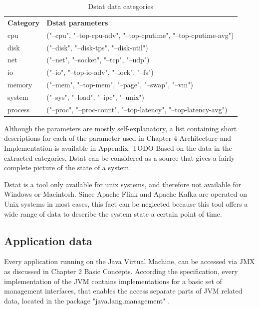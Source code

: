 \begin{table}[H]
    \begin{tabular}{ll}
        \textbf{Category} & \textbf{Dstat parameters} \\
        cpu & ("--cpu", "--top-cpu-adv", "--top-cputime", "--top-cputime-avg")\\
        disk & ("--disk", "--disk-tps", "--disk-util")\\
        net & ("--net", "--socket", "--tcp", "--udp")\\
        io & ("--io", "--top-io-adv", "--lock", "--fs")\\
        memory & ("--mem", "--top-mem", "--page", "--swap", "--vm")\\
        system & ("--sys", "--load", "--ipc", "--unix")\\
        process & ("--proc", "--proc-count", "--top-latency", "--top-latency-avg")\\
    \end{tabular}
    \caption{Dstat data categories}
    \label{tbl:dstatcategories}
\end{table}

Although the parameters are mostly self-explanatory, a list containing short descriptions
for each of the parameter used in Chapter 4 Architecture and Implementation is available in
Appendix. TODO Based on the data in the extracted categories, Dstat can be considered
as a source that gives a fairly complete picture of the state of a system.

Dstat is a tool only available for unix systems, and therefore not available for Windows or
Macintosh. Since Apache Flink and Apache Kafka are operated on Unix systems in most
cases, this fact can be neglected because this tool offers a wide range of data to describe
the system state a certain point of time.

\subsection{Application data}

Every application running on the Java Virtual Machine, can be accessed via JMX as discussed
in Chapter 2 Basic Concepts. According the specification, every implementation of the JVM contains
implementations for a basic set of management interfaces, that enables the access separate parts of JVM related data,
located in the package "java.lang.management" \cite{Javadoc16}.

